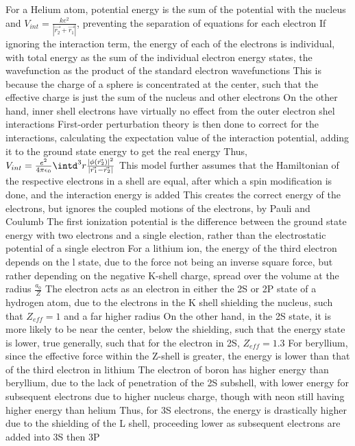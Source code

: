\documentclass[11 pt, twoside]{article}
\newenvironment{outline*}
{
	\begin{outline}[enumerate]
	}
	{\end{outline}
}
\begin{document}
\begin{outline*}
\1 For a Helium atom, potential energy is the sum of the potential with the nucleus and $V_{int} = \frac{ke^2}{|\vec{r_2} + \vec{r_1}|}$, preventing the separation of equations for each electron
	\2 If ignoring the interaction term, the energy of each of the electrons is individual, with total energy as the sum of the individual electron energy states, the wavefunction as the product of the standard electron wavefunctions
		\3 This is because the charge of a sphere is concentrated at the center, such that the effective charge is just the sum of the nucleus and other electrons
			\4 On the other hand, inner shell electrons have virtually no effect from the outer electron shel interactions
		\3 First-order perturbation theory is then done to correct for the interactions, calculating the expectation value of the interaction potential, adding it to the ground state energy to get the real energy
			\4 Thus, $V_{int} = \frac{e^2}{4\pi\epsilon_0}\intd^3r \frac{|\phi(\vec{r_2})|^2}{|\vec{r_1} - \vec{r_2}|}$
			\4 This model further assumes that the Hamiltonian of the respective electrons in a shell are equal, after which a spin modification is done, and the interaction energy is added
			\4 This creates the correct energy of the electrons, but ignores the coupled motions of the electrons, by Pauli and Coulumb
	\2 The first ionization potential is the difference between the ground state energy with two electrons and a single election, rather than the electrostatic potential of a single electron
\1 For a lithium ion, the energy of the third electron depends on the l state, due to the force not being an inverse square force, but rather depending on the negative K-shell charge, spread over the volume at the radius $\frac{a_0}{Z}$
	\2 The electron acts as an electron in either the 2S or 2P state of a hydrogen atom, due to the electrons in the K shell shielding the nucleus, such that $Z_{eff} = 1$ and a far higher radius
		\3 On the other hand, in the 2S state, it is more likely to be near the center, below the shielding, such that the energy state is lower, true generally, such that for the electron in 2S, $Z_{eff} = 1.3$
	\2 For beryllium, since the effective force within the Z-shell is greater, the energy is lower than that of the third electron in lithium
	\2 The electron of boron has higher energy than beryllium, due to the lack of penetration of the 2S subshell, with lower energy for subsequent electrons due to higher nucleus charge, though with neon still having higher energy than helium 
	\2 Thus, for 3S electrons, the energy is drastically higher due to the shielding of the L shell, proceeding lower as subsequent electrons are added into 3S then 3P

\end{outline*}
\end{document}
